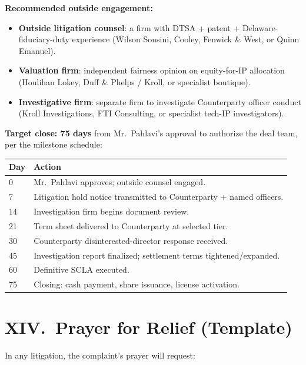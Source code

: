 \documentclass[11pt,letterpaper]{article}
\begin{document}
\textbf{Recommended outside engagement:}

\begin{itemize}[leftmargin=1.5em,itemsep=0.1em]
\item \textbf{Outside litigation counsel}: a firm with DTSA + patent
+ Delaware-fiduciary-duty experience (Wilson Sonsini, Cooley, Fenwick
\& West, or Quinn Emanuel).
\item \textbf{Valuation firm}: independent fairness opinion on
equity-for-IP allocation (Houlihan Lokey, Duff \& Phelps / Kroll, or
specialist boutique).
\item \textbf{Investigative firm}: separate firm to investigate
Counterparty officer conduct (Kroll Investigations, FTI Consulting,
or specialist tech-IP investigators).
\end{itemize}

\textbf{Target close: 75 days} from Mr.\ Pahlavi's approval to
authorize the deal team, per the milestone schedule:

\begin{center}
\begin{tabular}{lp{10cm}}
\toprule
\textbf{Day} & \textbf{Action} \\
\midrule
0   & Mr.\ Pahlavi approves; outside counsel engaged. \\
7   & Litigation hold notice transmitted to Counterparty + named officers. \\
14  & Investigation firm begins document review. \\
21  & Term sheet delivered to Counterparty at selected tier. \\
30  & Counterparty disinterested-director response received. \\
45  & Investigation report finalized; settlement terms tightened/expanded. \\
60  & Definitive SCLA executed. \\
75  & Closing: cash payment, share issuance, license activation. \\
\bottomrule
\end{tabular}
\end{center}

\section*{XIV.\ Prayer for Relief (Template)}

In any litigation, the complaint's prayer will request:
\end{document}

